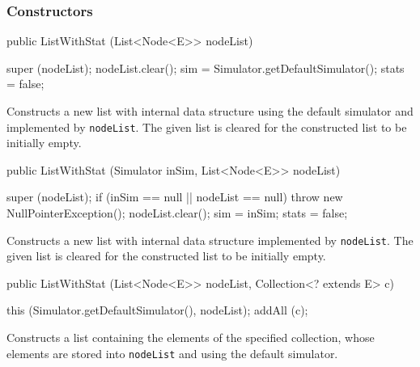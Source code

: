\subsubsection* {Constructors}
\begin{code}

   public ListWithStat (List<Node<E>> nodeList)\begin{hide} {
      super (nodeList);
      nodeList.clear();
      sim = Simulator.getDefaultSimulator();
      stats = false;
   }\end{hide}
\end{code}
\begin{tabb}
  Constructs a new list with internal data structure using the default simulator and implemented by \texttt{nodeList}.
  The given list is cleared for the constructed list to be initially empty.
\end{tabb}
\begin{code}

   public ListWithStat (Simulator inSim, List<Node<E>> nodeList)\begin{hide} {
      super (nodeList);
      if (inSim == null || nodeList == null)
          throw new NullPointerException();
      nodeList.clear();
      sim = inSim;
      stats = false;
   }\end{hide}
\end{code}
\begin{tabb}
  Constructs a new list with internal data structure implemented by
  \texttt{nodeList}.
  The given list is cleared for the constructed list to be initially empty.
\end{tabb}
\begin{htmlonly}
\end{htmlonly}
\begin{code}

   public ListWithStat (List<Node<E>> nodeList, Collection<? extends E> c)\begin{hide} {
      this (Simulator.getDefaultSimulator(), nodeList);
      addAll (c);
   }\end{hide}
\end{code}
\begin{tabb} Constructs a list containing the elements of the specified
   collection, whose elements are stored into \texttt{nodeList} and using the default simulator.
\end{tabb}
\begin{htmlonly}
\end{htmlonly}

